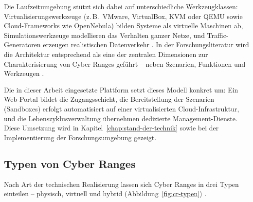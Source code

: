Die Laufzeitumgebung stützt sich dabei auf unterschiedliche Werkzeugklassen: Virtualisierungswerkzeuge (z.\,B.\ VMware, VirtualBox, KVM oder QEMU sowie Cloud-Frameworks wie
OpenNebula) bilden Systeme als virtuelle Maschinen ab, Simulationswerkzeuge modellieren das
Verhalten ganzer Netze, und Traffic-Generatoren erzeugen realistischen Datenverkehr
\cite[14--21]{IntroductionCyberRanges2022}. In der Forschungsliteratur wird die Architektur entsprechend
als eine der zentralen Dimensionen zur Charakterisierung von Cyber Ranges geführt -- neben
Szenarien, Funktionen und Werkzeugen \cite{Yamin2020CyberRanges}.

Die in dieser Arbeit eingesetzte Plattform setzt dieses Modell konkret um: Ein Web-Portal bildet
die Zugangsschicht, die Bereitstellung der Szenarien (Sandboxes) erfolgt automatisiert auf einer
virtualisierten Cloud-Infrastruktur, und die Lebenszyklusverwaltung übernehmen dedizierte
Management-Dienste. Diese Umsetzung wird in Kapitel~\ref{chap:stand-der-technik} sowie bei der
Implementierung der Forschungsumgebung gezeigt.

\subsection{Typen von Cyber Ranges}
\label{subsec:cr-typen}

Nach Art der technischen Realisierung lassen sich Cyber Ranges in drei Typen einteilen --
physisch, virtuell und hybrid (Abbildung~\ref{fig:cr-typen})
\cite[47--63]{IntroductionCyberRanges2022}.

